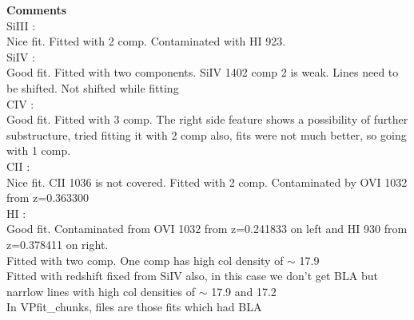 \documentclass[12pt,draft]{report}
\begin{document}
\textbf{Comments}  \\


SiIII :  \\  \hspace*{1.5cm}
        Nice fit. Fitted with 2 comp. Contaminated with HI 923. \\ 

SiIV :  \\  \hspace*{1.5cm}
        Good fit. Fitted with two components. SiIV 1402 comp 2 is weak. Lines need to be shifted. Not shifted while fitting        \\

CIV :  \\  \hspace*{1.5cm}
        Good fit. Fitted with 3 comp. The right side feature shows a possibility of further substructure, tried fitting it with 2 comp also, fits were not much better, so going with 1 comp.       \\            

CII :  \\  \hspace*{1.5cm}
        Nice fit. CII 1036 is not covered. Fitted with 2 comp. Contaminated by OVI 1032 from z=0.363300  \\

HI :  \\  \hspace*{1.5cm}
        Good fit. Contaminated from OVI 1032 from z=0.241833 on left and HI 930 from z=0.378411 on right.  \\
        Fitted with two comp. One comp has high col density of  $\sim$ 17.9  \\

        Fitted with redshift fixed from SiIV also, in this case we don't get BLA but narrlow lines with high col densities of  $\sim$  17.9 and 17.2  \\
        In VPfit\_chunks, files are those fits which had BLA  \\


\newpage
\end{document}
